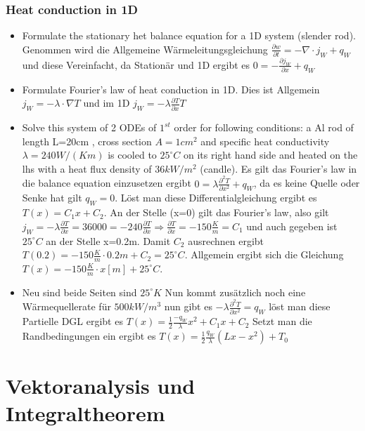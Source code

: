 \documentclass[a4paper]{scrartcl}
\begin{document}
\subsubsection{Heat conduction in 1D}
\begin{itemize}

\item Formulate the stationary het balance equation for a 1D system (slender rod). Genommen wird die Allgemeine Wärmeleitungsgleichung $\frac{\partial w}{\partial t}= -\nabla \cdot j_W+q_W$ und diese Vereinfacht, da Stationär und 1D ergibt es $0= -\frac{\partial j_W}{\partial x}+q_W$

\item Formulate Fourier's law of heat conduction in 1D. Dies ist Allgemein $j_W=-\lambda \cdot \nabla T$ und im 1D $j_W=-\lambda \frac{\partial T}{\partial x} T$

\item Solve this system of 2 ODEs of $1^{st}$ order for following conditions: a Al rod of length L=20cm , cross section $A=1cm^2$ and specific heat conductivity 
$ \lambda = 240 W/(Km) $ 
is cooled to $25^\circ C$ on its right hand side and heated on the lhs with a heat flux density of $ 36 kW/m^2 $ (candle).
Es gilt das Fourier's law in die balance equation einzusetzen ergibt $ 0=\lambda \frac{\partial^2T}{\partial x^2}+q_W$, da es keine Quelle oder Senke hat gilt $q_W=0$. Löst man diese Differentialgleichung ergibt es $T(x)=C_1x+C_2$. An der Stelle (x=0) gilt das Fourier's law, also gilt $j_W=-\lambda \frac{\partial T}{\partial x} = 36000 = -240 \frac{\partial T}{\partial x } \Rightarrow \frac{\partial T}{\partial x}=-150 \frac{K}{m} =C_1$ und auch gegeben ist $25^\circ C$ an der Stelle x=0.2m. Damit $C_2$ ausrechnen ergibt  $ T(0.2)= -150 \frac{K}{m} \cdot 0.2m+C_2=25^{\circ} C $. Allgemein ergibt sich die Gleichung $ T(x)= -150 \frac{K}{m} \cdot x [m] + 25^{\circ} C $.

\item Neu sind beide Seiten sind $25^\circ K$ Nun kommt zusätzlich noch eine Wärmequellerate für $500 kW/m^3$ nun gibt es $ -\lambda \frac{\partial^2T}{\partial x^2}=q_W$ löst man diese Partielle DGL ergibt es $T(x)=\frac{1}{2}\frac{-q_W}{\lambda} x^2+C_1x+C_2$ Setzt man die Randbedingungen ein ergibt es $T(x)=\frac{1}{2}\frac{q_W}{\lambda}(Lx-x^2)+T_0$


\end{itemize}


\section{Vektoranalysis und Integraltheorem}
\end{document}
